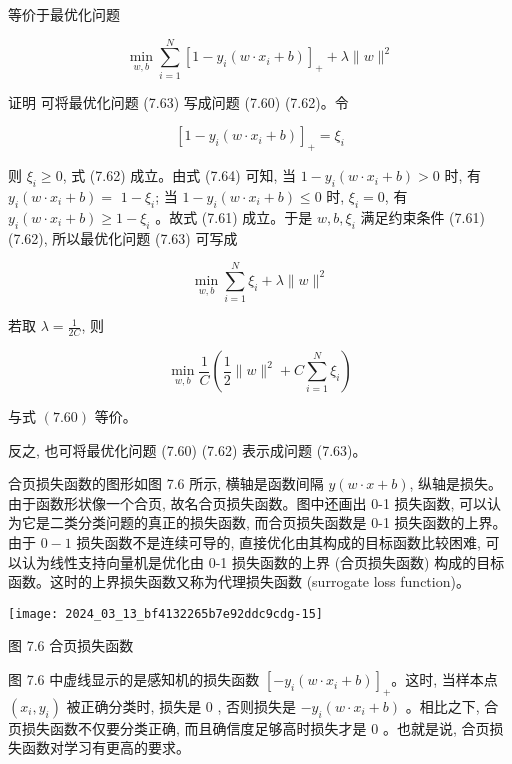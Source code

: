 \documentclass[10pt]{article}
\begin{document}
等价于最优化问题


\begin{equation*}
\min _{w, b} \sum_{i=1}^{N}\left[1-y_{i}\left(w \cdot x_{i}+b\right)\right]_{+}+\lambda\|w\|^{2} \tag{7.63}
\end{equation*}


证明 可将最优化问题 (7.63) 写成问题 (7.60) (7.62)。令


\begin{equation*}
\left[1-y_{i}\left(w \cdot x_{i}+b\right)\right]_{+}=\xi_{i} \tag{7.64}
\end{equation*}


则 $\xi_{i} \geqslant 0$, 式 (7.62) 成立。由式 (7.64) 可知, 当 $1-y_{i}\left(w \cdot x_{i}+b\right)>0$ 时, 有 $y_{i}\left(w \cdot x_{i}+b\right)=$ $1-\xi_{i}$; 当 $1-y_{i}\left(w \cdot x_{i}+b\right) \leqslant 0$ 时, $\xi_{i}=0$, 有 $y_{i}\left(w \cdot x_{i}+b\right) \geqslant 1-\xi_{i}$ 。故式 (7.61) 成立。于是 $w, b, \xi_{i}$ 满足约束条件 (7.61) (7.62), 所以最优化问题 (7.63) 可写成

$$
\min _{w, b} \sum_{i=1}^{N} \xi_{i}+\lambda\|w\|^{2}
$$

若取 $\lambda=\frac{1}{2 C}$, 则

$$
\min _{w, b} \frac{1}{C}\left(\frac{1}{2}\|w\|^{2}+C \sum_{i=1}^{N} \xi_{i}\right)
$$

与式 $(7.60)$ 等价。

反之, 也可将最优化问题 (7.60) (7.62) 表示成问题 (7.63)。

合页损失函数的图形如图 7.6 所示, 横轴是函数间隔 $y(w \cdot x+b)$, 纵轴是损失。由于函数形状像一个合页, 故名合页损失函数。图中还画出 0-1 损失函数, 可以认为它是二类分类问题的真正的损失函数, 而合页损失函数是 0-1 损失函数的上界。由于 $0-1$ 损失函数不是连续可导的, 直接优化由其构成的目标函数比较困难, 可以认为线性支持向量机是优化由 0-1 损失函数的上界 (合页损失函数) 构成的目标函数。这时的上界损失函数又称为代理损失函数 (surrogate loss function)。

\begin{center}
\texttt{[image: 2024\_03\_13\_bf4132265b7e92ddc9cdg-15]}
\end{center}

图 7.6 合页损失函数

图 7.6 中虚线显示的是感知机的损失函数 $\left[-y_{i}\left(w \cdot x_{i}+b\right)\right]_{+}$。这时, 当样本点 $\left(x_{i}, y_{i}\right)$ 被正确分类时, 损失是 0 , 否则损失是 $-y_{i}\left(w \cdot x_{i}+b\right)$ 。相比之下, 合页损失函数不仅要分类正确, 而且确信度足够高时损失才是 0 。也就是说, 合页损失函数对学习有更高的要求。
\end{document}
